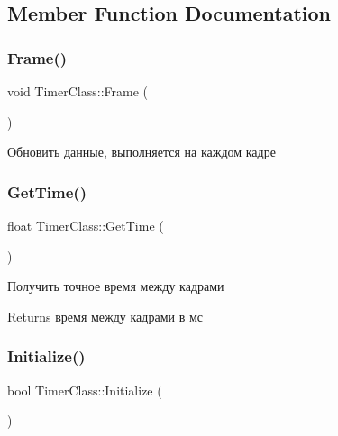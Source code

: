 \subsection{Member Function Documentation}
\mbox{\label{class_timer_class_a38f90c92c63e720ecd129c1e9153a58d}} 
\subsubsection{\texorpdfstring{Frame()}{Frame()}}
{\footnotesize\ttfamily void Timer\+Class\+::\+Frame (\begin{DoxyParamCaption}{ }\end{DoxyParamCaption})}



Обновить данные, выполняется на каждом кадре 

\mbox{\label{class_timer_class_a454dfe3e22e422bd1d2fe91eee1c1cb4}} 
\subsubsection{\texorpdfstring{Get\+Time()}{GetTime()}}
{\footnotesize\ttfamily float Timer\+Class\+::\+Get\+Time (\begin{DoxyParamCaption}{ }\end{DoxyParamCaption})}



Получить точное время между кадрами 

\begin{DoxyReturn}{Returns}
время между кадрами в мс 
\end{DoxyReturn}
\mbox{\label{class_timer_class_ad19e65fd9cc771671a3fbdf75510bd49}} 
\subsubsection{\texorpdfstring{Initialize()}{Initialize()}}
{\footnotesize\ttfamily bool Timer\+Class\+::\+Initialize (\begin{DoxyParamCaption}{ }\end{DoxyParamCaption})}



